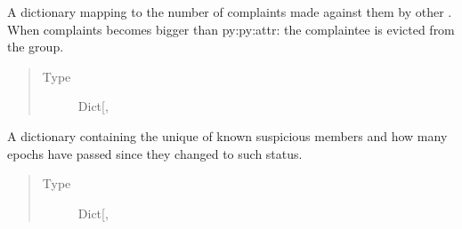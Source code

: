 \documentclass[letterpaper,10pt,english]{sphinxmanual}
\begin{document}
\begin{fulllineitems}
\begin{fulllineitems}
\label{\detokenize{app.domain:app.domain.cluster_groups.SGClusterExt.nodes_complaints}}
A dictionary mapping {\hyperref[\detokenize{app.domain:app.domain.network_nodes.Node.id}]{}} to the number of complaints
made against them by other {\hyperref[\detokenize{app.domain:app.domain.cluster_groups.Cluster.members}]{}}. When
complaints becomes bigger than py:py:attr:
the complaintee is evicted from the group.
\begin{quote}\begin{description}
\item[{Type}] \leavevmode
Dict{[}, \sphinxhref{https://docs.python.org/3.7/library/functions.html\#int}{int}{]}

\end{description}\end{quote}

\end{fulllineitems}


\begin{fulllineitems}
\label{\detokenize{app.domain:app.domain.cluster_groups.SGClusterExt.suspicious_nodes}}
A dictionary containing the unique {\hyperref[\detokenize{app.domain:app.domain.network_nodes.Node.id}]{}} of known suspicious
members and how many epochs have passed since they changed to such
status.
\begin{quote}\begin{description}
\item[{Type}] \leavevmode
Dict{[}, \sphinxhref{https://docs.python.org/3.7/library/functions.html\#int}{int}{]}

\end{description}\end{quote}

\end{fulllineitems}


\end{fulllineitems}
\end{document}
